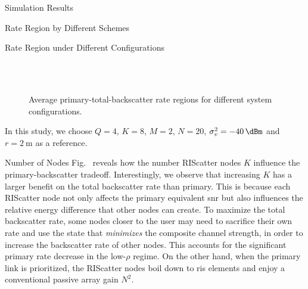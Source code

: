 \documentclass[journal]{IEEEtran}
\begin{document}
\begin{section}{Simulation Results}
\begin{subsection}{Rate Region by Different Schemes}
	\end{subsection}


	\begin{subsection}{Rate Region under Different Configurations}
		\begin{figure}[!t]
			\centering
			\\
			\\
			\caption{
				Average primary-total-backscatter rate regions for different system configurations.
			}
			\label{fg:region_config}
		\end{figure}
		In this study, we choose $Q=4$, $K=8$, $M=2$, $N=20$, $\sigma_v^2=\SI{-40}{\dBm}$ and $r=\SI{2}{\meter}$ as a reference.
		\begin{subsubsection}{Number of Nodes}
			Fig.~ reveals how the number RIScatter nodes $K$ influence the primary-backscatter tradeoff.
			Interestingly, we observe that increasing $K$ has a larger benefit on the total backscatter rate than primary.
			This is because each RIScatter node not only affects the primary equivalent \gls{snr} but also influences the relative energy difference that other nodes can create.
			To maximize the total backscatter rate, some nodes closer to the user may need to sacrifice their own rate and use the state that \emph{minimizes} the composite channel strength, in order to increase the backscatter rate of other nodes.
			This accounts for the significant primary rate decrease in the low-$\rho$ regime.
			On the other hand, when the primary link is prioritized, the RIScatter nodes boil down to \gls{ris} elements and enjoy a conventional passive array gain $N^2$.
		\end{subsubsection}


\end{subsection}
\end{section}
\end{document}
